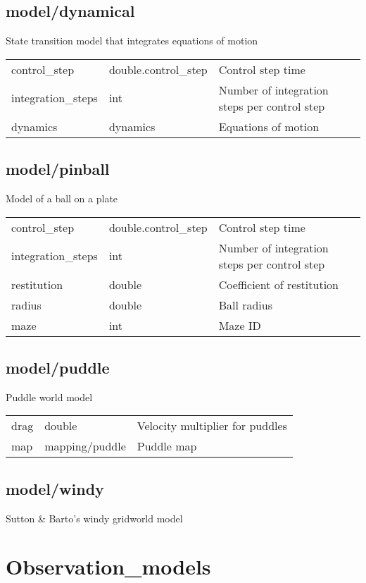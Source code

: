 \subsection{model/dynamical}
\noindent State transition model that integrates equations of motion\\

\noindent\begin{tabular}{@{}lll@{}}
control\_step&double.control\_step&Control step time\\
integration\_steps&int&Number of integration steps per control step\\
dynamics&dynamics&Equations of motion\\
\end{tabular}
\subsection{model/pinball}
\noindent Model of a ball on a plate\\

\noindent\begin{tabular}{@{}lll@{}}
control\_step&double.control\_step&Control step time\\
integration\_steps&int&Number of integration steps per control step\\
restitution&double&Coefficient of restitution\\
radius&double&Ball radius\\
maze&int&Maze ID\\
\end{tabular}
\subsection{model/puddle}
\noindent Puddle world model\\

\noindent\begin{tabular}{@{}lll@{}}
drag&double&Velocity multiplier for puddles\\
map&mapping/puddle&Puddle map\\
\end{tabular}
\subsection{model/windy}
\noindent Sutton \& Barto's windy gridworld model\\

\section{Observation\_models}
